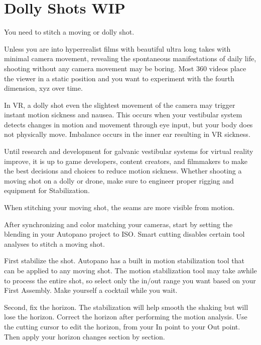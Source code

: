\chapter{Dolly Shots WIP}
\pagecolor{white}
\label{chap:45}
\begin{fullwidth}

\problem

{\large You need to stitch a moving or dolly shot. \par}

Unless you are into hyperrealist films with beautiful ultra long takes with minimal camera movement, revealing the spontaneous manifestations of daily life, shooting without any camera movement may be boring. Most 360 videos place the viewer in a static position and you want to experiment with the fourth dimension, xyz over time.

In VR, a dolly shot even the slightest movement of the camera may trigger instant motion sickness and nausea. This occurs when your vestibular system detects changes in motion and movement through eye input, but your body does not physically move. Imbalance occurs in the inner ear resulting in VR sickness. 

Until research and development for galvanic vestibular systems for virtual reality improve, it is up to game developers, content creators, and filmmakers to make the best decisions and choices to reduce motion sickness. Whether shooting a moving shot on a dolly or drone, make sure to engineer proper rigging and equipment for Stabilization. 

When stitching your moving shot, the seams are more visible from motion.

\clearpage
\solution

After synchronizing and color matching your cameras, start by setting the blending in your Autopano project to ISO. Smart cutting disables certain tool analyses to stitch a moving shot. 


First stabilize the shot. Autopano has a built in motion stabilization tool that can be applied to any moving shot. The motion stabilization tool may take awhile to process the entire shot, so select only the in/out range you want based on your First Assembly. Make yourself a cocktail while you wait.

\clearpage
Second, fix the horizon. The stabilization will help smooth the shaking but will lose the horizon. Correct the horizon after performing the motion analysis. Use the cutting cursor to edit the horizon, from your In point to your Out point. Then apply your horizon changes section by section.


\end{fullwidth}
